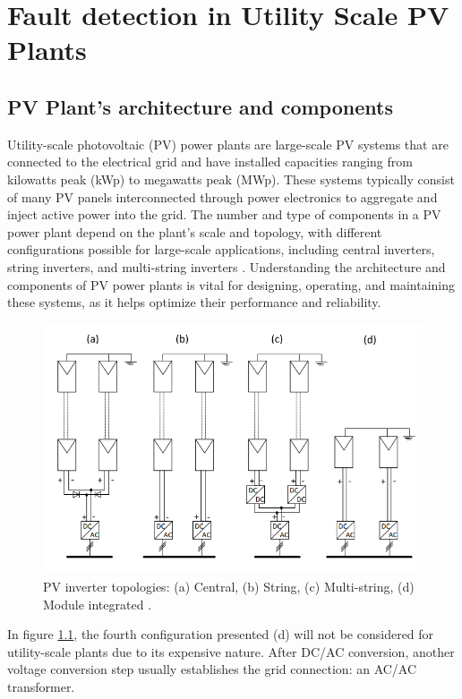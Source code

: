\chapter{Fault detection in Utility Scale PV Plants}


\section{PV Plant's architecture and components}

Utility-scale photovoltaic (PV) power plants are large-scale PV systems that are connected to the electrical grid and have installed capacities ranging from kilowatts peak (kWp) to megawatts peak (MWp). These systems typically consist of many PV panels interconnected through power electronics to aggregate and inject active power into the grid. The number and type of components in a PV power plant depend on the plant's scale and topology, with different configurations possible for large-scale applications, including central inverters, string inverters, and multi-string inverters \cite{lspv}. Understanding the architecture and components of PV power plants is vital for designing, operating, and maintaining these systems, as it helps optimize their performance and reliability.

\begin{figure}[h]
    \centering
    \includegraphics[width=12cm]{figures/topologies.png}
    \caption{PV inverter topologies:  (a) Central, (b) String, (c) Multi-string,
    (d) Module integrated \cite{lspv}.}
    \label{topologies}
\end{figure}

In figure \ref{topologies}, the fourth configuration presented (d) will not be considered for utility-scale plants due to its expensive nature. After DC/AC conversion, another voltage conversion step usually establishes the grid connection: an AC/AC transformer.

